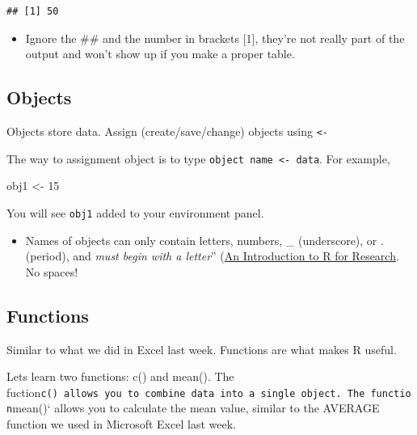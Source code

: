 \documentclass[
]{book}
\newenvironment{Shaded}{\begin{snugshade}}{\end{snugshade}}
\newcommand{\DecValTok}[1]{\textcolor[rgb]{0.00,0.00,0.81}{#1}}
\newcommand{\NormalTok}[1]{#1}
\newcommand{\OtherTok}[1]{\textcolor[rgb]{0.56,0.35,0.01}{#1}}
\providecommand{\tightlist}{%
  \setlength{\itemsep}{0pt}\setlength{\parskip}{0pt}}
\begin{document}
\begin{verbatim}
## [1] 50
\end{verbatim}

\begin{itemize}
\tightlist
\item
  Ignore the \#\# and the number in brackets {[}1{]}, they're not really part of the output and won't show up if you make a proper table.
\end{itemize}

\subsection*{Objects}\label{objects}

Objects store data. Assign (create/save/change) objects using \texttt{\textless{}-}

The way to assignment object is to type \texttt{object\ name\ \textless{}-\ data}. For example,

\begin{Shaded}
\begin{Highlighting}[]
\NormalTok{obj1 }\OtherTok{\textless{}{-}} \DecValTok{15}
\end{Highlighting}
\end{Shaded}

You will see \texttt{obj1} added to your environment panel.

\begin{itemize}
\tightlist
\item
  Names of objects can only contain letters, numbers, \_ (underscore), or . (period), and \emph{must begin with a letter}'' (\href{https://bookdown.org/rwnahhas/IntroToR/naming-objects.html}{An Introduction to R for Research}. No spaces!
\end{itemize}

\subsection*{Functions}\label{functions}

Similar to what we did in Excel last week. Functions are what makes R useful.

Lets learn two functions: c() and mean(). The fuction\texttt{c()\ allows\ you\ to\ combine\ data\ into\ a\ single\ object.\ The\ function}mean()` allows you to calculate the mean value, similar to the AVERAGE function we used in Microsoft Excel last week.
\end{document}
